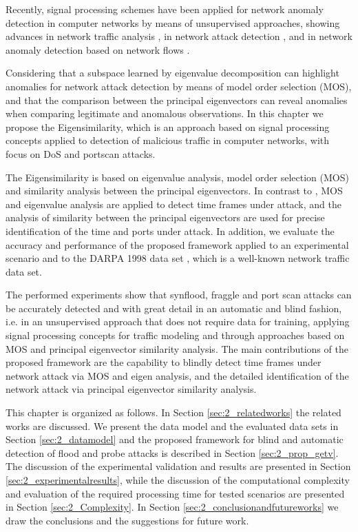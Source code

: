 Recently, signal processing schemes have been applied for network anomaly detection in computer networks by means of unsupervised approaches, showing advances in network traffic analysis \cite{Zonglin2009}, in network attack detection \cite{callegari2011novel}, and in network anomaly detection based on network flows \cite{Lu2009}.

Considering that a subspace learned by eigenvalue decomposition can highlight anomalies for network attack detection by means of model order selection (MOS), and that the comparison between the principal eigenvectors can reveal anomalies when comparing legitimate and anomalous observations. In this chapter we propose the Eigensimilarity, which is an approach based on signal processing concepts applied to detection of malicious traffic in computer networks, with focus on DoS and portscan attacks. 

The Eigensimilarity is based on eigenvalue analysis, model order selection (MOS) and similarity analysis between the principal eigenvectors. In contrast to \cite{david2011blind, da2012improved, tenorio2013greatest}, MOS and eigenvalue analysis are applied to detect time frames under attack, and the analysis of similarity between the principal eigenvectors are used for precise identification of the time and ports under attack. In addition, we evaluate the accuracy and performance of the proposed framework applied to an experimental scenario and to the DARPA 1998 data set \citep{osanaiye2016distributed}, which is a well-known network traffic data set. 

The performed experiments show that synflood, fraggle and port scan attacks can be accurately detected and with great detail in an automatic and blind fashion, i.e. in an unsupervised approach that does not require data for training, applying signal processing concepts for traffic modeling and through approaches based on MOS and principal eigenvector similarity analysis. The main contributions of the proposed framework are the capability to blindly detect time frames under network attack via MOS and eigen analysis, and the detailed identification of the network attack via principal eigenvector similarity analysis.

This chapter is organized as follows. In Section \ref{sec:2_relatedworks} the related works are discussed. We present the data model and the evaluated data sets in Section \ref{sec:2_datamodel} and the proposed framework for blind and automatic detection of flood and probe attacks is described in Section \ref{sec:2_prop_getv}. The discussion of the experimental validation and results are presented in Section \ref{sec:2_experimentalresults}, while the discussion of the computational complexity and evaluation of the required processing time for tested scenarios are presented in Section \ref{sec:2_Complexity}. In Section \ref{sec:2_conclusionandfutureworks} we draw the conclusions and the suggestions for future work.



